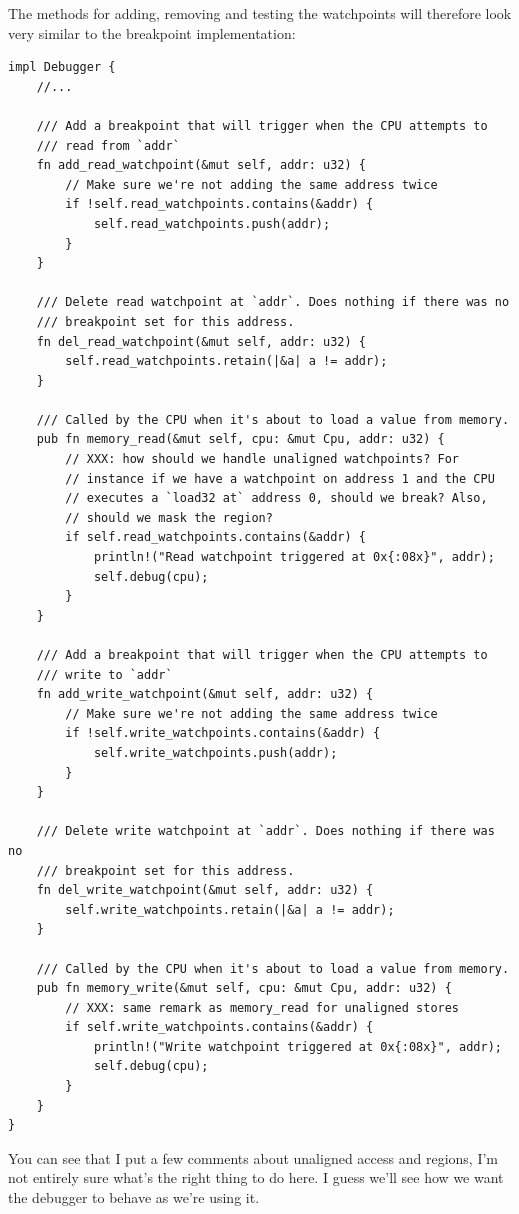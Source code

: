 \documentclass[a4paper]{article}
\begin{document}
The methods for adding, removing and testing the watchpoints will
therefore look very similar to the breakpoint implementation:

\begin{lstlisting}
impl Debugger {
    //...

    /// Add a breakpoint that will trigger when the CPU attempts to
    /// read from `addr`
    fn add_read_watchpoint(&mut self, addr: u32) {
        // Make sure we're not adding the same address twice
        if !self.read_watchpoints.contains(&addr) {
            self.read_watchpoints.push(addr);
        }
    }

    /// Delete read watchpoint at `addr`. Does nothing if there was no
    /// breakpoint set for this address.
    fn del_read_watchpoint(&mut self, addr: u32) {
        self.read_watchpoints.retain(|&a| a != addr);
    }

    /// Called by the CPU when it's about to load a value from memory.
    pub fn memory_read(&mut self, cpu: &mut Cpu, addr: u32) {
        // XXX: how should we handle unaligned watchpoints? For
        // instance if we have a watchpoint on address 1 and the CPU
        // executes a `load32 at` address 0, should we break? Also,
        // should we mask the region?
        if self.read_watchpoints.contains(&addr) {
            println!("Read watchpoint triggered at 0x{:08x}", addr);
            self.debug(cpu);
        }
    }

    /// Add a breakpoint that will trigger when the CPU attempts to
    /// write to `addr`
    fn add_write_watchpoint(&mut self, addr: u32) {
        // Make sure we're not adding the same address twice
        if !self.write_watchpoints.contains(&addr) {
            self.write_watchpoints.push(addr);
        }
    }

    /// Delete write watchpoint at `addr`. Does nothing if there was no
    /// breakpoint set for this address.
    fn del_write_watchpoint(&mut self, addr: u32) {
        self.write_watchpoints.retain(|&a| a != addr);
    }

    /// Called by the CPU when it's about to load a value from memory.
    pub fn memory_write(&mut self, cpu: &mut Cpu, addr: u32) {
        // XXX: same remark as memory_read for unaligned stores
        if self.write_watchpoints.contains(&addr) {
            println!("Write watchpoint triggered at 0x{:08x}", addr);
            self.debug(cpu);
        }
    }
}
\end{lstlisting}

You can see that I put a few comments about unaligned access and
regions, I'm not entirely sure what's the right thing to do here. I
guess we'll see how we want the debugger to behave as we're using it.
\end{document}
